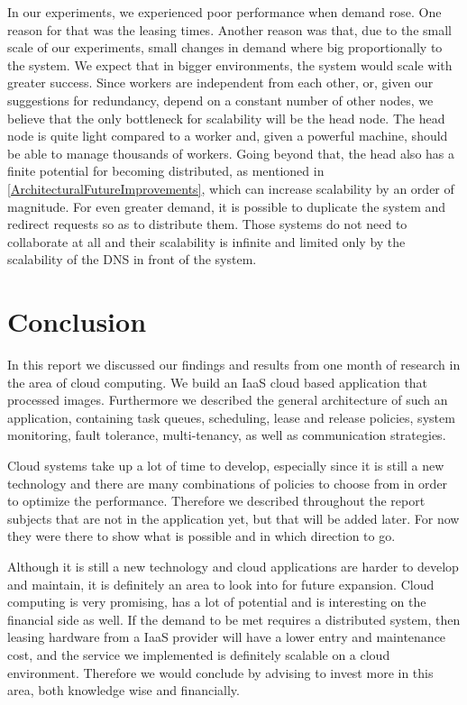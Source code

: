 \documentclass{stylesheet}
\begin{document}
In our experiments, we experienced poor performance when demand rose. One reason for that was the leasing times. Another reason was that, due to the small scale of our experiments, small changes in demand where big proportionally to the system. We expect that in bigger environments, the system would scale with greater success. Since workers are independent from each other, or, given our suggestions for redundancy, depend on a constant number of other nodes, we believe that the only bottleneck for scalability will be the head node. The head node is quite light compared to a worker and, given a powerful machine, should be able to manage thousands of workers. Going beyond that, the head also has a finite potential for becoming distributed, as mentioned in \ref{ArchitecturalFutureImprovements}, which can increase scalability by an order of magnitude. For even greater demand, it is possible to duplicate the system and redirect requests so as to distribute them. Those systems do not need to collaborate at all and their scalability is infinite and limited only by the scalability of the DNS in front of the system.

\section{Conclusion}
\label{sec:conclusion}
In this report we discussed our findings and results from one month of research in the area of cloud computing. We build an IaaS cloud based application that processed images. Furthermore we described the general architecture of such an application, containing task queues, scheduling, lease and release policies, system monitoring, fault tolerance, multi-tenancy, as well as communication strategies.

Cloud systems take up a lot of time to develop, especially since it is still a new technology and there are many combinations of policies to choose from in order to optimize the performance. Therefore we described throughout the report subjects that are not in the application yet, but that will be added later. For now they were there to show what is possible and in which direction to go.

Although it is still a new technology and cloud applications are harder to develop and maintain, it is definitely an area to look into for future expansion. Cloud computing is very promising, has a lot of potential and is interesting on the financial side as well. If the demand to be met requires a distributed system, then leasing hardware from a IaaS provider will have a lower entry and maintenance cost, and the service we implemented is definitely scalable on a cloud environment. Therefore we would conclude by advising to invest more in this area, both knowledge wise and financially.
\end{document}
